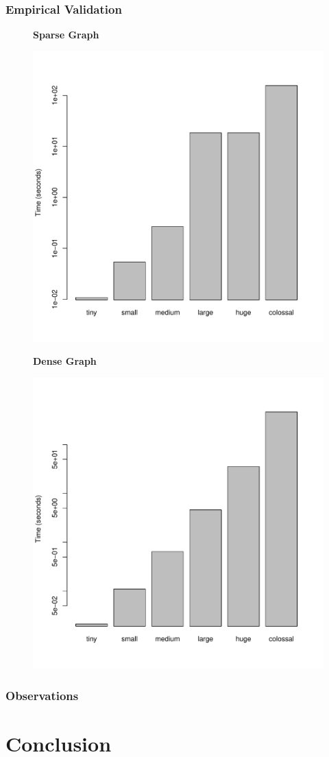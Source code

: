 \documentclass[a4paper,12pt]{article}
\begin{document}
\subsubsection{Empirical Validation}
\begin{figure}[h]
  \centering
  \textbf{Sparse Graph}\par\medskip
  \includegraphics[scale=0.3]{Johnson-FibonacciHeapsparse}
\end{figure}
\begin{figure}[h]
  \centering
  \textbf{Dense Graph}\par\medskip
  \includegraphics[scale=0.3]{Johnson-FibonacciHeapdense}
\end{figure}
\subsubsection{Observations}
\section{Conclusion}
\end{document}
